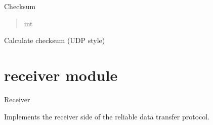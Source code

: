 \documentclass[letterpaper,10pt,english]{sphinxmanual}
\begin{document}
\begin{fulllineitems}
\begin{fulllineitems}
\begin{quote}
\begin{description}
\end{description}\end{quote}

\end{fulllineitems}


\begin{fulllineitems}
\label{\detokenize{packet:packet.Packet.checksum}}
\pysigstartsignatures
\pysigline
{}
\pysigstopsignatures
\sphinxAtStartPar
Checksum
\begin{quote}\begin{description}
\sphinxAtStartPar
int

\end{description}\end{quote}

\end{fulllineitems}


\begin{fulllineitems}
\label{\detokenize{packet:packet.Packet.calculate_checksum}}
\pysigstartsignatures
\pysiglinewithargsret
{}
{}
{}
\pysigstopsignatures
\sphinxAtStartPar
Calculate checksum (UDP style)

\end{fulllineitems}


\end{fulllineitems}


\sphinxstepscope


\section{receiver module}
\label{\detokenize{receiver:module-receiver}}\label{\detokenize{receiver:receiver-module}}\label{\detokenize{receiver::doc}}
\sphinxAtStartPar
Receiver

\sphinxAtStartPar
Implements the receiver side of the reliable data transfer protocol.
\end{document}
